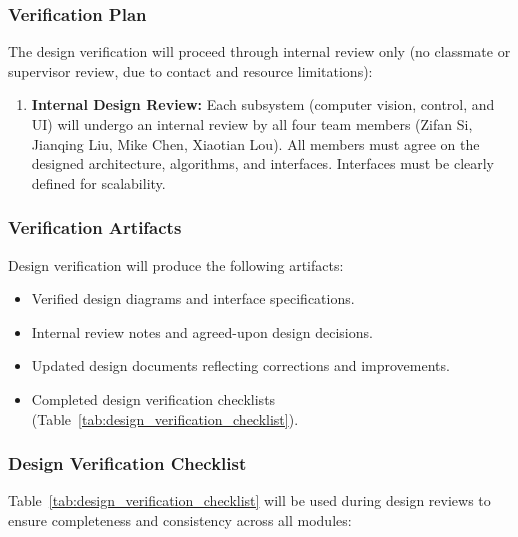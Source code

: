 \documentclass[12pt, titlepage]{article}
\begin{document}
\subsubsection*{Verification Plan}
The design verification will proceed through internal review only (no classmate
or supervisor review, due to contact and resource limitations):
\begin{enumerate}
  \item \textbf{Internal Design Review:}
        Each subsystem (computer vision, control, and UI)
        will undergo an internal review by all four team members
        (Zifan Si, Jianqing Liu, Mike Chen, Xiaotian Lou).
        All members must agree on the designed architecture, algorithms,
        and interfaces. Interfaces must be clearly defined for scalability.
\end{enumerate}

\subsubsection*{Verification Artifacts}
Design verification will produce the following artifacts:
\begin{itemize}
  \item Verified design diagrams and interface specifications.
  \item Internal review notes and agreed-upon design decisions.
  \item Updated design documents reflecting corrections and improvements.
  \item Completed design verification checklists
        (Table~\ref{tab:design_verification_checklist}).
\end{itemize}

\subsubsection*{Design Verification Checklist}
Table~\ref{tab:design_verification_checklist} will be used during design reviews to ensure
completeness and consistency across all modules:

\newpage
\end{document}
